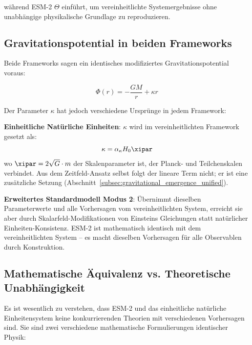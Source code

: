 	während ESM-2 $\Theta$ einführt, um vereinheitlichte Systemergebnisse ohne unabhängige physikalische Grundlage zu reproduzieren.
	
	\subsection{Gravitationspotential in beiden Frameworks}
	\label{subsec:gravitational_potential}
	
	Beide Frameworks sagen ein identisches modifiziertes Gravitationspotential voraus:
	
	\begin{equation}
		\Phi(r) = -\frac{GM}{r} + \kappa r
	\end{equation}
	
	Der Parameter $\kappa$ hat jedoch verschiedene Ursprünge in jedem Framework:
	
	\textbf{Einheitliche Natürliche Einheiten}: $\kappa$ wird im vereinheitlichten Framework gesetzt als:
	\begin{equation}
		\kappa = \alpha_\kappa H_0 \xipar
	\end{equation}
	wo $\xipar = 2\sqrt{G} \cdot m$ der Skalenparameter ist, der Planck- und Teilchenskalen verbindet. Aus dem Zeitfeld-Ansatz selbst folgt der lineare Term nicht; er ist eine zusätzliche Setzung (Abschnitt~\ref{subsec:gravitational_emergence_unified}).
	
	\textbf{Erweitertes Standardmodell Modus 2}: Übernimmt dieselben Parameterwerte und alle Vorhersagen vom vereinheitlichten System, erreicht sie aber durch Skalarfeld-Modifikationen von Einsteins Gleichungen statt natürlicher Einheiten-Konsistenz. ESM-2 ist mathematisch identisch mit dem vereinheitlichten System – es macht dieselben Vorhersagen für alle Observablen durch Konstruktion.
	
	\subsection{Mathematische Äquivalenz vs. Theoretische Unabhängigkeit}
	\label{subsec:equivalence_vs_independence}
	
	Es ist wesentlich zu verstehen, dass ESM-2 und das einheitliche natürliche Einheitensystem keine konkurrierenden Theorien mit verschiedenen Vorhersagen sind. Sie sind zwei verschiedene mathematische Formulierungen identischer Physik:
	
